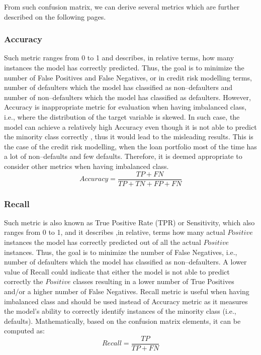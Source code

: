 From such confusion matrix, we can derive several metrics which are further described on the following pages.

\subsubsection{Accuracy}
Such metric ranges from 0 to 1 and describes, in relative terms, how many instances the model has correctly predicted. Thus, the goal is to minimize the number of False Positives and False Negatives, or in credit risk modelling terms, number of defaulters which the model has classified as non--defaulters and number of non--defaulters which the model has classified as defaulters.
However, Accuracy is inappropriate metric for evaluation when having imbalanced class, i.e., where the distribution of the target variable is skewed.
In such case, the model can achieve a relatively high Accuracy even though it is not able to predict the minority class correctly \citep{brownlee2021failure}, thus it would lead to the misleading results.
This is the case of the credit risk modelling, when the loan portfolio most of the time has a lot of non--defaults and few defaults.
Therefore, it is deemed appropriate to consider other metrics when having imbalanced class.
\begin{equation}\label{eq}
    Accuracy = \frac{TP + FN}{TP + TN + FP + FN}
\end{equation}

\subsubsection{Recall}
\label{subsubsec:recall}
Such metric is also known as True Positive Rate (TPR) or Sensitivity, which also ranges from 0 to 1, and it describes ,in relative, terms how many actual $Positive$ instances the model has correctly predicted out of all the actual $Positive$ instances. Thus, the goal is to minimize the number of False Negatives, i.e., number of defaulters which the model has classified as non--defaulters.
A lower value of Recall could indicate that either the model is not able to predict correctly the $Positive$ classes resulting in a lower number of True Positives and/or a higher number of False Negatives.
Recall metric is useful when having imbalanced class and should be used instead of Accuracy metric as it measures the model's ability to correctly identify instances of the minority class (i.e., defaults).
Mathematically, based on the confusion matrix elements, it can be computed as:
\begin{equation}\label{eq}
    Recall = \frac{TP}{TP + FN}
\end{equation}

